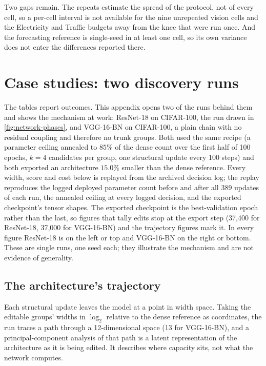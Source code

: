 \documentclass[10pt]{article}
\theoremstyle{paper}
\begin{document}
Two gaps remain. The repeats estimate the spread of the protocol, not of every cell, so a
per-cell interval is not available for the nine unrepeated vision cells and the Electricity and Traffic
budgets away from the knee that were run once. And the forecasting reference is single-seed in
at least one cell, so its own variance does not enter the differences reported there.

\section{Case studies: two discovery runs}
\label{app:case-studies}

The tables report outcomes. This appendix opens two of the runs behind them and shows the mechanism at work: ResNet-18 on CIFAR-100, the run drawn in \cref{fig:network-phases}, and VGG-16-BN on CIFAR-100, a plain chain with no residual coupling and therefore no trunk groups. Both used the same recipe (a parameter ceiling annealed to $85\%$ of the dense count over the first half of 100 epochs, $k=4$ candidates per group, one structural update every 100 steps) and both exported an architecture $15.0\%$ smaller than the dense reference. Every width, score and cost below is replayed from the archived decision log; the replay reproduces the logged deployed parameter count before and after all 389 updates of each run, the annealed ceiling at every logged decision, and the exported checkpoint's tensor shapes. The exported checkpoint is the best-validation epoch rather than the last, so figures that tally edits stop at the export step (37,400 for ResNet-18, 37,000 for VGG-16-BN) and the trajectory figures mark it. In every figure ResNet-18 is on the left or top and VGG-16-BN on the right or bottom. These are single runs, one seed each; they illustrate the mechanism and are not evidence of generality.

\subsection{The architecture's trajectory}

Each structural update leaves the model at a point in width space. Taking the editable groups' widths in $\log_2$ relative to the dense reference as coordinates, the run traces a path through a 12-dimensional space (13 for VGG-16-BN), and a principal-component analysis of that path is a latent representation of the architecture as it is being edited. It describes where capacity sits, not what the network computes.
\end{document}
